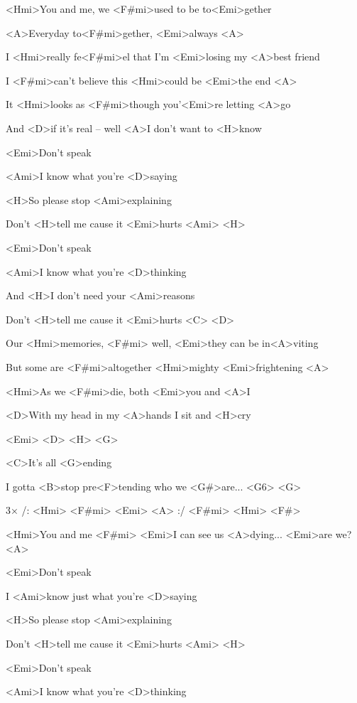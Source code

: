 

\zs
<Hmi>You and me, we <F#mi>used to be to<Emi>gether

<A>Everyday to<F#mi>gether, <Emi>always <A>

I <Hmi>really fe<F#mi>el that I'm <Emi>losing my <A>best friend

I <F#mi>can't believe this <Hmi>could be <Emi>the end <A>

It <Hmi>looks as <F#mi>though you'<Emi>re letting <A>go

And <D>if it's real -- well <A>I don't want to <H>know
\ks

\zr
<Emi>Don't speak

<Ami>I know what you're <D>saying

<H>So please stop <Ami>explaining

Don't <H>tell me cause it <Emi>hurts <Ami> <H>

<Emi>Don't speak

<Ami>I know what you're <D>thinking

And <H>I don't need your <Ami>reasons

Don't <H>tell me cause it <Emi>hurts <C> <D>
\kr

\zs
Our <Hmi>memories, <F#mi> well, <Emi>they can be in<A>viting

But some are <F#mi>altogether <Hmi>mighty <Emi>frightening <A>

<Hmi>As we <F#mi>die, both <Emi>you and <A>I

<D>With my head in my <A>hands I sit and <H>cry
\ks

\zr\kr

<Emi> <D> <H> <G>

\zs
<C>It's all <G>ending

I gotta <B>stop pre<F>tending who we <G#>are... <G6> <G>

3× /: <Hmi> <F#mi> <Emi> <A> :/ <F#mi> <Hmi> <F#>

<Hmi>You and me <F#mi> <Emi>I can see us <A>dying... <Emi>are we? <A>
\ks

\zr
<Emi>Don't speak

I <Ami>know just what you're <D>saying

<H>So please stop <Ami>explaining

Don't <H>tell me cause it <Emi>hurts <Ami> <H>

<Emi>Don't speak

<Ami>I know what you're <D>thinking

